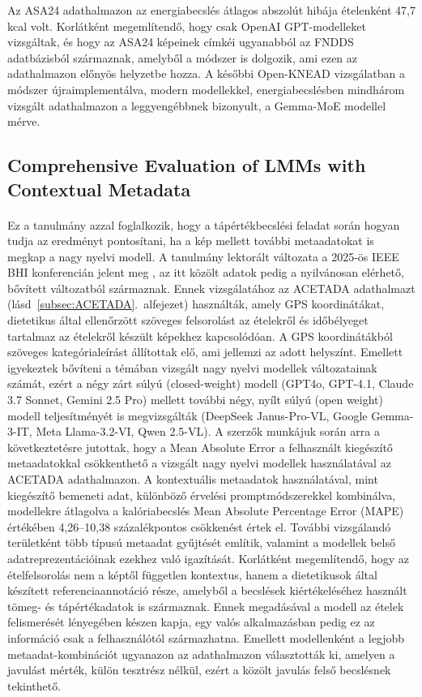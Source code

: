 Az ASA24 adathalmazon az energiabecslés átlagos abszolút hibája ételenként 47,7 kcal volt. Korlátként megemlítendő, hogy csak OpenAI GPT-modelleket vizsgáltak, és hogy az ASA24 képeinek címkéi ugyanabból az FNDDS adatbázisból származnak, amelyből a módszer is dolgozik, ami ezen az adathalmazon előnyös helyzetbe hozza. A későbbi Open-KNEAD vizsgálatban a módszer újraimplementálva, modern modellekkel, energiabecslésben mindhárom vizsgált adathalmazon a leggyengébbnek bizonyult, a Gemma-MoE modellel mérve.

\subsection{Comprehensive Evaluation of LMMs with Contextual Metadata}
\paragraph{}Ez a tanulmány \cite{coburn2025acetada} azzal foglalkozik, hogy a tápértékbecslési feladat során hogyan tudja az eredményt pontosítani, ha a kép mellett további metaadatokat is megkap a nagy nyelvi modell.
A tanulmány lektorált változata a 2025-ös IEEE BHI konferencián jelent meg \cite{coburn2025bhi}, az itt közölt adatok pedig a nyilvánosan elérhető, bővített változatból \cite{coburn2025acetada} származnak.
Ennek vizsgálatához az ACETADA adathalmazt (lásd~\ref{subsec:ACETADA}.~alfejezet) használták, amely GPS koordinátákat, dietetikus által ellenőrzött szöveges felsorolást az ételekről és időbélyeget tartalmaz az ételekről készült képekhez kapcsolódóan. A GPS koordinátákból szöveges kategórialeírást állítottak elő, ami jellemzi az adott helyszínt.
Emellett igyekeztek bővíteni a témában vizsgált nagy nyelvi modellek változatainak számát, ezért a négy zárt súlyú (closed-weight) modell (GPT4o, GPT-4.1, Claude 3.7 Sonnet, Gemini 2.5 Pro) mellett további négy, nyílt súlyú (open weight) modell teljesítményét is megvizsgálták (DeepSeek Janus-Pro-VL, Google Gemma-3-IT, Meta Llama-3.2-VI, Qwen 2.5-VL).
A szerzők munkájuk során arra a következtetésre jutottak, hogy a Mean Absolute Error a felhasznált kiegészítő metaadatokkal csökkenthető a vizsgált nagy nyelvi modellek használatával az ACETADA adathalmazon. 
A kontextuális metaadatok használatával, mint kiegészítő bemeneti adat, különböző érvelési promptmódszerekkel kombinálva, modellekre átlagolva a kalóriabecslés Mean Absolute Percentage Error (MAPE) értékében 4,26--10,38 százalékpontos csökkenést értek el.
További vizsgálandó területként több típusú metaadat gyűjtését említik, valamint a modellek belső adatreprezentációinak ezekhez való igazítását. 
Korlátként megemlítendő, hogy az ételfelsorolás nem a képtől független kontextus, hanem a dietetikusok által készített referenciaannotáció része, amelyből a becslések kiértékeléséhez használt tömeg- és tápértékadatok is származnak. Ennek megadásával a modell az ételek felismerését lényegében készen kapja, egy valós alkalmazásban pedig ez az információ csak a felhasználótól származhatna. Emellett modellenként a legjobb metaadat-kombinációt ugyanazon az adathalmazon választották ki, amelyen a javulást mérték, külön tesztrész nélkül, ezért a közölt javulás felső becslésnek tekinthető.



